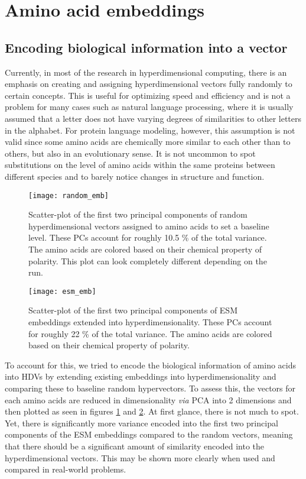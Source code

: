 \section{Amino acid embeddings}
\subsection*{Encoding biological information into a vector}
Currently, in most of the research in hyperdimensional computing, there is an emphasis on creating and assigning hyperdimensional vectors fully randomly to certain concepts. This is useful for optimizing speed and efficiency and is not a problem for many cases such as natural language processing, where it is usually assumed that a letter does not have varying degrees of similarities to other letters in the alphabet. For protein language modeling, however, this assumption is not valid since some amino acids are chemically more similar to each other than to others, but also in an evolutionary sense. It is not uncommon to spot substitutions on the level of amino acids within the same proteins between different species and to barely notice changes in structure and function.

\begin{figure}[H]
    \centering
    \texttt{[image: random\_emb]}
    \caption{Scatter-plot of the first two principal components of random hyperdimensional vectors assigned to amino acids to set a baseline level. These PCs account for roughly 10.5 \% of the total variance. The amino acids are colored based on their chemical property of polarity. This plot can look completely different depending on the run.}
    \label{fig:AArand}
\end{figure}

\begin{figure}[H]
    \centering
    \texttt{[image: esm\_emb]}
    \caption{Scatter-plot of the first two principal components of ESM embeddings extended into hyperdimensionality. These PCs account for roughly 22 \% of the total variance. The amino acids are colored based on their chemical property of polarity.}
    \label{fig:AAesm}
\end{figure}


To account for this, we tried to encode the biological information of amino acids into HDVs by extending existing embeddings into hyperdimensionality and comparing these to baseline random hypervectors. To assess this, the vectors for each amino acids are reduced in dimensionality \textit{via} PCA into 2 dimensions and then plotted as seen in figures \ref{fig:AArand} and \ref{fig:AAesm}. At first glance, there is not much to spot. Yet, there is significantly more variance encoded into the first two principal components of the ESM embeddings compared to the random vectors, meaning that there should be a significant amount of similarity encoded into the hyperdimensional vectors. This may be shown more clearly when used and compared in real-world problems.

